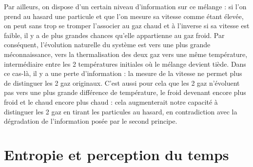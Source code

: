 Par ailleurs, on dispose d'un certain niveau d'information sur ce mélange : si l’on prend au hasard une particule et que l'on mesure sa vitesse comme étant élevée, on peut sans trop se tromper l'associer au gaz chaud et à l'inverse si sa vitesse est faible, il y a de plus grandes chances qu'elle appartienne au gaz froid. Par conséquent, l'évolution naturelle du système est vers une plus grande méconnaissance, vers la thermalisation des deux gaz vers une même température, intermédiaire entre les 2 températures initiales où le mélange devient tiède. Dans ce cas-là, il y a une perte d'information : la mesure de la vitesse ne permet plus de distinguer les 2 gaz originaux. C'est aussi pour cela que les 2 gaz n'évoluent pas vers une plus grande différence de température, le froid devenant encore plus froid et le chaud encore plus chaud : cela augmenterait notre capacité à distinguer les 2 gaz en tirant les particules au hasard, en contradiction avec la dégradation de l'information posée par le second principe.

\section{Entropie et perception du temps}

